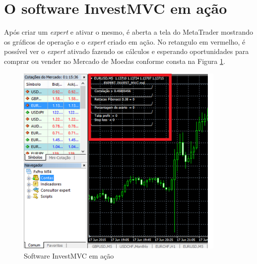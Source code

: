 \section{O software InvestMVC em ação}
Após criar um \textit{expert} e ativar o mesmo, é aberta a tela do MetaTrader mostrando os gráficos de operação e o \textit{expert} criado em ação. No retangulo em vermelho, é possível ver o \textit{expert} ativado fazendo os cálculos e esperando oportunidades para comprar ou vender no Mercado de Moedas conforme consta na Figura \ref{wine}.

\begin{figure}[H]
\centering
\includegraphics[width=0.9\textwidth]{figuras/wine}
\caption{Software InvestMVC em ação}
\label{wine}
\end{figure}
